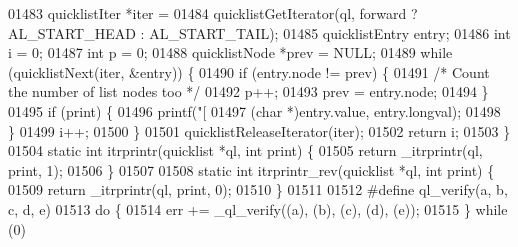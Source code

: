 \begin{DoxyCode}
{{{{{{{{{{{{{{{{{01483     quicklistIter *iter =
01484         quicklistGetIterator(ql, forward ? AL\_START\_HEAD : AL\_START\_TAIL);
01485     quicklistEntry entry;
01486     \textcolor{keywordtype}{int} i = 0;
01487     \textcolor{keywordtype}{int} p = 0;
01488     quicklistNode *prev = NULL;
01489     \textcolor{keywordflow}{while} (quicklistNext(iter, &entry)) \{
01490         \textcolor{keywordflow}{if} (entry.node != prev) \{
01491             \textcolor{comment}{/* Count the number of list nodes too */}
01492             p++;
01493             prev = entry.node;
01494         \}
01495         \textcolor{keywordflow}{if} (print) \{
01496             printf(\textcolor{stringliteral}{"[%
01497                    (\textcolor{keywordtype}{char} *)entry.value, entry.longval);
01498         \}
01499         i++;
01500     \}
01501     quicklistReleaseIterator(iter);
01502     \textcolor{keywordflow}{return} i;
01503 \}
01504 \textcolor{keyword}{static} \textcolor{keywordtype}{int} itrprintr(quicklist *ql, \textcolor{keywordtype}{int} print) \{
01505     \textcolor{keywordflow}{return} \_itrprintr(ql, print, 1);
01506 \}
01507 
01508 \textcolor{keyword}{static} \textcolor{keywordtype}{int} itrprintr\_rev(quicklist *ql, \textcolor{keywordtype}{int} print) \{
01509     \textcolor{keywordflow}{return} \_itrprintr(ql, print, 0);
01510 \}
01511 
01512 \textcolor{preprocessor}{#}\textcolor{preprocessor}{define} \textcolor{preprocessor}{ql\_verify}\textcolor{preprocessor}{(}\textcolor{preprocessor}{a}\textcolor{preprocessor}{,} \textcolor{preprocessor}{b}\textcolor{preprocessor}{,} \textcolor{preprocessor}{c}\textcolor{preprocessor}{,} \textcolor{preprocessor}{d}\textcolor{preprocessor}{,} \textcolor{preprocessor}{e}\textcolor{preprocessor}{)}
01513     \textcolor{preprocessor}{do} \textcolor{preprocessor}{\{}
01514         \textcolor{preprocessor}{err} \textcolor{preprocessor}{+=} \textcolor{preprocessor}{\_ql\_verify}\textcolor{preprocessor}{(}\textcolor{preprocessor}{(}\textcolor{preprocessor}{a}\textcolor{preprocessor}{)}\textcolor{preprocessor}{,} \textcolor{preprocessor}{(}\textcolor{preprocessor}{b}\textcolor{preprocessor}{)}\textcolor{preprocessor}{,} \textcolor{preprocessor}{(}\textcolor{preprocessor}{c}\textcolor{preprocessor}{)}\textcolor{preprocessor}{,} \textcolor{preprocessor}{(}\textcolor{preprocessor}{d}\textcolor{preprocessor}{)}\textcolor{preprocessor}{,} \textcolor{preprocessor}{(}\textcolor{preprocessor}{e}\textcolor{preprocessor}{)}\textcolor{preprocessor}{)}\textcolor{preprocessor}{;}
01515     \textcolor{preprocessor}{\}} \textcolor{preprocessor}{while} \textcolor{preprocessor}{(}0\textcolor{preprocessor}{)}
}}}}}}}}}}}}}}}}}}
\end{DoxyCode}

